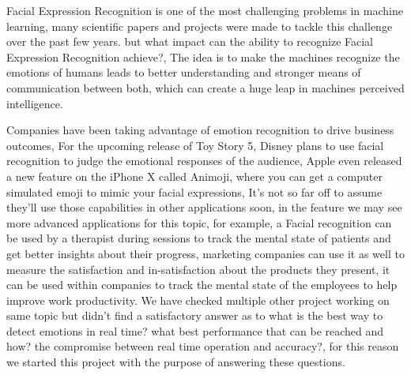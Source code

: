 Facial Expression Recognition is one of the most challenging problems in machine learning, many scientific papers and projects were made to tackle this challenge over the past few years.\newline
but what impact can the ability to recognize Facial Expression Recognition achieve?, The idea is to make the machines recognize the emotions of humans leads to better understanding and stronger means of communication between both, which can create a huge leap in machines perceived intelligence.\newline
\bigbreak

Companies have been taking advantage of emotion recognition to drive business outcomes, For the upcoming release of Toy Story 5, Disney plans to use facial recognition to judge the emotional responses of the audience, Apple even released a new feature on the iPhone X called Animoji, where you can get a computer simulated emoji to mimic your facial expressions, It’s not so far off to assume they’ll use those capabilities in other applications soon, in the feature we may see more advanced applications for this topic, for example, a Facial recognition can be used by a therapist during sessions to track the mental state of patients and get better insights about their progress, marketing companies can use it as well to measure the satisfaction and in-satisfaction about the products they present, it can be used within companies to track the mental state of the employees to help improve work productivity.
\bigbreak
We have checked multiple other project working on same topic but didn't find a satisfactory answer as to what is the best way to detect emotions in real time? what best performance that can be reached and how? the compromise between real time operation and accuracy?, for this reason we started this project with the purpose of answering these questions.
\newpage

